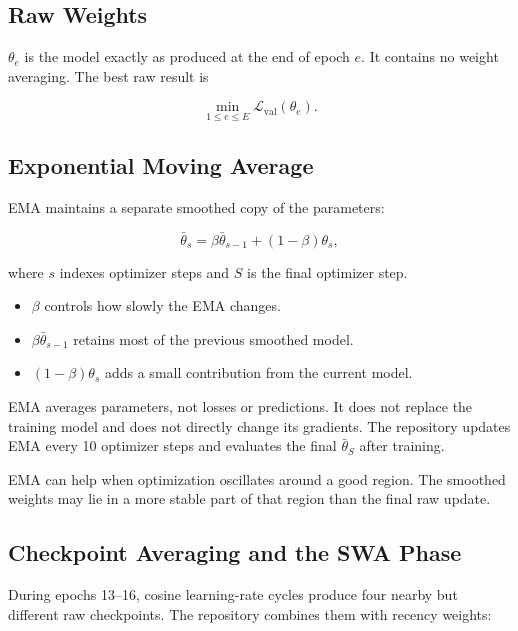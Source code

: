 \documentclass[11pt,a4paper]{article}
\begin{document}
\subsection{Raw Weights}

$\theta_e$ is the model exactly as produced at the end of epoch $e$. It contains
no weight averaging. The best raw result is

\begin{equation}
  \min_{1\le e\le E}\mathcal{L}_{\mathrm{val}}(\theta_e).
\end{equation}

\subsection{Exponential Moving Average}

EMA maintains a separate smoothed copy of the parameters:

\begin{equation}
  \bar\theta_s
  =\beta\bar\theta_{s-1}+(1-\beta)\theta_s,
\end{equation}

where $s$ indexes optimizer steps and $S$ is the final optimizer step.

\begin{itemize}
  \item $\beta$ controls how slowly the EMA changes.
  \item $\beta\bar\theta_{s-1}$ retains most of the previous smoothed model.
  \item $(1-\beta)\theta_s$ adds a small contribution from the current model.
\end{itemize}

EMA averages parameters, not losses or predictions. It does not replace the
training model and does not directly change its gradients. The repository
updates EMA every 10 optimizer steps and evaluates the final $\bar\theta_S$
after training.

EMA can help when optimization oscillates around a good region. The smoothed
weights may lie in a more stable part of that region than the final raw update.

\subsection{Checkpoint Averaging and the SWA Phase}

During epochs 13--16, cosine learning-rate cycles produce four nearby but
different raw checkpoints. The repository combines them with recency weights:
\end{document}
